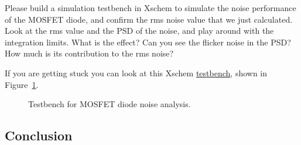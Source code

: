 \documentclass[
  a4paper,
  DIV=11,
  numbers=noendperiod]{scrartcl}
\begin{document}
\begin{tcolorbox}[enhanced jigsaw, breakable, title=\textcolor{quarto-callout-tip-color}{\faLightbulb}\hspace{0.5em}{Exercise: MOSFET Diode Noise}, left=2mm, bottomrule=.15mm, opacitybacktitle=0.6, opacityback=0, colframe=quarto-callout-tip-color-frame, leftrule=.75mm, bottomtitle=1mm, colbacktitle=quarto-callout-tip-color!10!white, toprule=.15mm, rightrule=.15mm, toptitle=1mm, titlerule=0mm, arc=.35mm, colback=white, coltitle=black]

Please build a simulation testbench in Xschem to simulate the noise
performance of the MOSFET diode, and confirm the rms noise value that we
just calculated. Look at the rms value and the PSD of the noise, and
play around with the integration limits. What is the effect? Can you see
the flicker noise in the PSD? How much is its contribution to the rms
noise?

If you are getting stuck you can look at this Xschem
\href{./xschem/mosfet_diode_noise.sch}{testbench}, shown in
Figure~\ref{fig-mosfet-diode-noise-tb}.

\begin{figure}[H]


\caption{\label{fig-mosfet-diode-noise-tb}Testbench for MOSFET diode
noise analysis.}

\end{figure}%

\end{tcolorbox}

\subsection{Conclusion}\label{conclusion-1}
\end{document}
